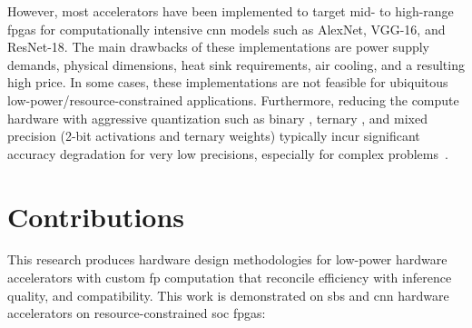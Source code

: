 \begin{itemize}
However, most accelerators have been implemented to target mid- to high-range \glspl{fpga} for computationally intensive \gls{cnn} models such as AlexNet, VGG-16, and ResNet-18. The main drawbacks of these implementations are power supply demands, physical dimensions, heat sink requirements, air cooling, and a resulting high price. In some cases, these implementations are not feasible for ubiquitous low-power/resource-constrained applications. Furthermore, reducing the compute hardware with aggressive quantization such as binary \cite{courbariaux2015binaryconnect}, ternary \cite{lin2015neural}, and mixed precision (2-bit activations and ternary weights) \cite{colangelo2018exploration} typically incur significant accuracy degradation for very low precisions, especially for complex problems~\cite{faraone2019addnet}.

\end{itemize}

\section{Contributions}
This research produces hardware design methodologies for low-power hardware accelerators with custom \gls{fp} computation that reconcile efficiency with inference quality, and compatibility. This work is demonstrated on \gls{sbs} and \gls{cnn} hardware accelerators on resource-constrained \gls{soc} \glspl{fpga}:

